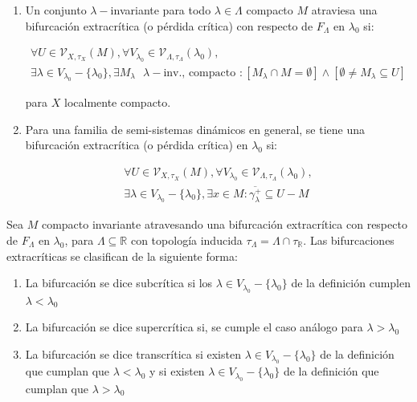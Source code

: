 \begin{defn}
	\begin{enumerate}
		\item Un conjunto $\lambda-$invariante para todo $\lambda \in \Lambda$ compacto $M$ atraviesa una bifurcación extracrítica (o pérdida crítica) con respecto de $F_\Lambda$ en $\lambda_0$ si:
		
		\begin{gather*}
			\forall U \in \mathcal{V}_{X,\tau_X}(M), \forall V_{\lambda_0} \in \mathcal{V}_{\Lambda,\tau_\Lambda}(\lambda_0), \\
			\exists \lambda \in V_{\lambda_0} - \{ \lambda_0 \}, \exists M_\lambda \text{ $\lambda-$inv., compacto }: [M_\lambda \cap M = \emptyset]  \land [\emptyset \neq M_\lambda \subseteq U]
		\end{gather*}
		
		para $X$ localmente compacto.
		
		\item Para una familia  de  semi-sistemas dinámicos en general, se tiene una bifurcación extracrítica (o pérdida crítica) en $\lambda_0$ si:
		
		\begin{gather*}
			\forall U \in \mathcal{V}_{X,\tau_X}(M), \forall V_{\lambda_0} \in \mathcal{V}_{\Lambda,\tau_\Lambda}(\lambda_0), \\
			\exists \lambda \in V_{\lambda_0} - \{ \lambda_0 \}, \exists x \in M :  \overline{\gamma^+_\lambda} \subseteq U-M 
		\end{gather*}
	\end{enumerate}
\end{defn}


\begin{defn}
	Sea $M$ compacto invariante atravesando una bifurcación extracrítica  con respecto de $F_\Lambda$ en $\lambda_0$, para $\Lambda \subseteq \mathbb{R}$ con topología inducida $\tau_\Lambda = \Lambda \cap \tau_{\mathbb{R}}$. Las bifurcaciones extracríticas se clasifican de la siguiente forma:
	
	\begin{enumerate}
		\item La bifurcación se dice subcrítica si los $\lambda\in V_{\lambda_0} - \{\lambda_0\}$ de la definición cumplen $\lambda< \lambda_0$
		 
		\item La bifurcación se dice supercrítica si, se cumple el caso análogo para $\lambda > \lambda_0$ 
		
		\item La bifurcación se dice transcrítica si existen $\lambda\in V_{\lambda_0} - \{\lambda_0\}$ de la definición que cumplan que $\lambda < \lambda_0$ y si existen   $\lambda\in V_{\lambda_0} - \{\lambda_0\}$ de la definición que cumplan que $\lambda > \lambda_0$
	\end{enumerate}
\end{defn}

